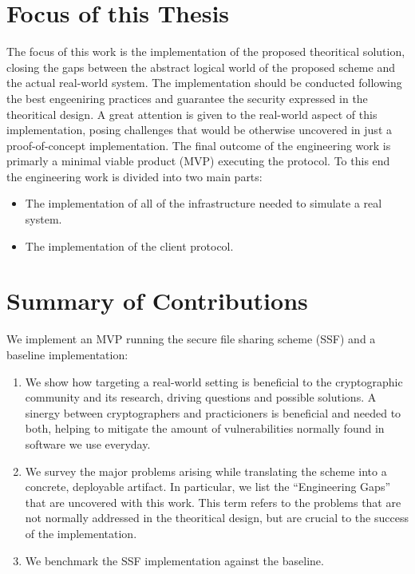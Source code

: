 \section{Focus of this Thesis}\label{sc:focus-of-this-thesis}

The focus of this work is the implementation of the proposed theoritical solution,
closing the gaps between the abstract logical world of the proposed scheme
and the actual real-world system.
The implementation should be conducted following the best engeeniring practices 
and guarantee the security expressed in the theoritical design.
A great attention is given to the real-world aspect of this implementation,
posing challenges that would be otherwise uncovered in just a proof-of-concept implementation.
The final outcome of the engineering work is primarly a minimal viable product (MVP) executing the protocol.
To this end the engineering work is divided into two main parts:
\begin{itemize}
    \item The implementation of all of the infrastructure needed to simulate a real system.
    \item The implementation of the client protocol.
\end{itemize}

\section{Summary of Contributions}

We implement an MVP running the secure file sharing scheme (SSF) and a baseline implementation:

\begin{enumerate}
    \item We show how targeting a real-world setting is beneficial to the cryptographic community and its research, driving questions and possible solutions. A sinergy between cryptographers and practicioners is beneficial and needed to both, helping to mitigate the amount of vulnerabilities normally found in software we use everyday.
    \item We survey the major problems arising while translating the scheme into a concrete, deployable artifact. In particular, we list the ``Engineering Gaps'' that are uncovered with this work. This term refers to the problems that are not normally addressed in the theoritical design, but are crucial to the success of the implementation.
    \item We benchmark the SSF implementation against the baseline.
\end{enumerate}

